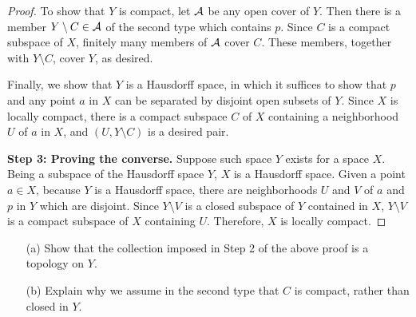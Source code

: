 \begin{proof}
    To show that $Y$ is compact, let ${\mathcal{A}}$ be any open cover of $Y$.
    Then there is a member $Y\setminus C\in{\mathcal{A}}$ of the second type which contains $p$.
    Since $C$ is a compact subspace of $X$, finitely many members of ${\mathcal{A}}$ cover $C$.
    These members, together with $Y\setminus C$, cover $Y$, as desired.

    Finally, we show that $Y$ is a Hausdorff space, in which it suffices to show that $p$ and any point $a$ in $X$ can be separated by disjoint open subsets of $Y$.
    Since $X$ is locally compact, there is a compact subspace $C$ of $X$ containing a neighborhood $U$ of $a$ in $X$, and $(U, Y\setminus C)$ is a desired pair.

    \textbf{Step 3: Proving the converse.}\newline\noindent
    Suppose such space $Y$ exists for a space $X$.
    Being a subspace of the Hausdorff space $Y$, $X$ is a Hausdorff space.
    Given a point $a\in X$, because $Y$ is a Hausdorff space, there are neighborhoods $U$ and $V$ of $a$ and $p$ in $Y$ which are disjoint.
    Since $Y\setminus V$ is a closed subspace of $Y$ contained in $X$, $Y\setminus V$ is a compact subspace of $X$ containing $U$.
    Therefore, $X$ is locally compact.
\end{proof}
\begin{prob}\label{check 1p cptf topology}
    \begin{enumerate}
        \item[(a)]
        {
            Show that the collection imposed in Step 2 of the above proof is a topology on $Y$.
        }
        \item[(b)]
        {
            Explain why we assume in the second type that $C$ is compact, rather than closed in $Y$.
        }
    \end{enumerate}
\end{prob}
